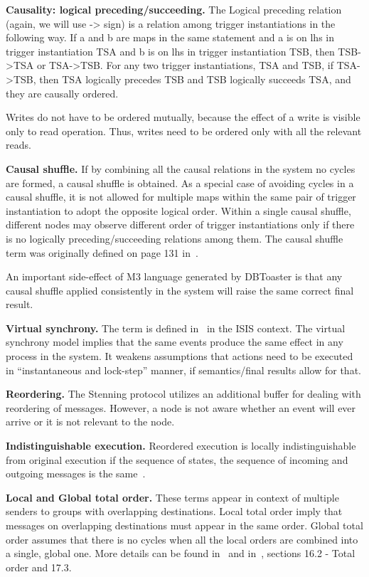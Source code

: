 \documentclass{sig-semester}
\begin{document}
\textbf{Causality: logical preceding/succeeding.} The Logical preceding relation (again, we will use -> sign) is a relation among trigger instantiations in the following way. If a and b are maps in the same statement and a is on lhs in trigger instantiation TSA and b is on lhs in trigger instantiation TSB, then TSB->TSA or TSA->TSB. For any two trigger instantiations, TSA and TSB, if TSA->TSB, then TSA logically precedes TSB and TSB logically succeeds TSA, and they are causally ordered.

Writes do not have to be ordered mutually, because the effect of a write is visible only to read operation. Thus, writes need to be ordered only with all the relevant reads.

\textbf{Causal shuffle.} If by combining all the causal relations in the system no cycles are formed, a causal shuffle is obtained. As a special case of avoiding cycles in a causal shuffle, it is not allowed for multiple maps within the same pair of trigger instantiation to adopt the opposite logical order. Within a single causal shuffle, different nodes may observe different order of trigger instantiations only if there is no logically preceding/succeeding relations among them. The causal shuffle term was originally defined on page 131 in~\cite{Attiya98}.

An important side-effect of M3 language generated by DBToaster is that any causal shuffle applied consistently in the system will raise the same correct final result. 

\textbf{Virtual synchrony.} The term is defined in~\cite{Birman87a} in the ISIS context. The virtual synchrony model implies that the same events produce the same effect in any process in the system. It weakens assumptions that actions need to be executed in ``instantaneous and lock-step'' manner, if semantics/final results allow for that.

\textbf{Reordering.} The Stenning protocol utilizes an additional buffer for dealing with reordering of messages. However, a node is not aware whether an event will ever arrive or it is not relevant to the node.

\textbf{Indistinguishable execution.} Reordered execution is locally indistinguishable from original execution if the sequence of states, the sequence of incoming and outgoing messages is the same~\cite{Attiya06}.

\textbf{Local and Global total order.} These terms appear in context of multiple senders to groups with overlapping destinations. Local total order imply that messages on overlapping destinations must appear in the same order. Global total order assumes that there is no cycles when all the local orders are combined into a single, global one. More details can be found in~\cite{defago03, hadzilacos94} and in~\cite{Birman06}, sections 16.2 - Total order and 17.3.
\end{document}
